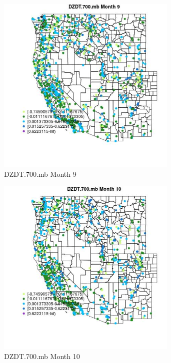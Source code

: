 \begin{figure} 
\centering  
\includegraphics[width=0.77\textwidth]{Code_Outputs/Report_ML_input_PM25_Step4_part_f_de_duplicated_aveswNAs_MapObsMo9DZDT700mb.jpg} 
\caption{\label{fig:Report_ML_input_PM25_Step4_part_f_de_duplicated_aveswNAsMapObsMo9DZDT700mb}DZDT.700.mb Month 9} 
\end{figure} 
 

\begin{figure} 
\centering  
\includegraphics[width=0.77\textwidth]{Code_Outputs/Report_ML_input_PM25_Step4_part_f_de_duplicated_aveswNAs_MapObsMo10DZDT700mb.jpg} 
\caption{\label{fig:Report_ML_input_PM25_Step4_part_f_de_duplicated_aveswNAsMapObsMo10DZDT700mb}DZDT.700.mb Month 10} 
\end{figure} 
 

